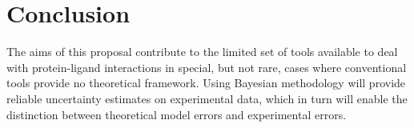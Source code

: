 \documentclass[10pt,final]{article}
\begin{document}

\section*{Conclusion}
The aims of this proposal contribute to the limited set of tools available to deal with protein-ligand interactions in special, but not rare, cases where conventional tools provide no theoretical framework. Using Bayesian methodology will provide reliable uncertainty estimates on experimental data, which in turn will enable the distinction between theoretical model errors and experimental errors.

\printbibliography
\end{document}
